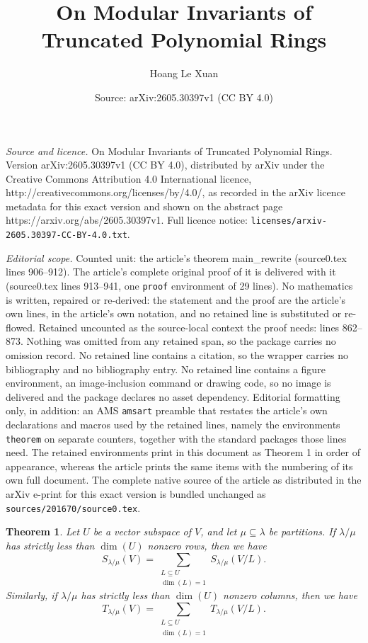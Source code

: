 \documentclass[10pt,a4paper]{amsart}
\title{On Modular Invariants of Truncated Polynomial Rings}
\author{Hoang Le Xuan}
\date{Source: arXiv:2605.30397v1 (CC BY 4.0)}
\newtheorem{theorem}{Theorem}
\begin{document}
\maketitle

\noindent\emph{Source and licence.} On Modular Invariants of Truncated Polynomial Rings. Version arXiv:2605.30397v1 (CC BY 4.0), distributed by arXiv under the Creative Commons Attribution 4.0 International licence, http://creativecommons.org/licenses/by/4.0/, as recorded in the arXiv licence metadata for this exact version and shown on the abstract page https://arxiv.org/abs/2605.30397v1. Full licence notice: \texttt{licenses/arxiv-2605.30397-CC-BY-4.0.txt}.\par\smallskip

\noindent\textit{Editorial scope.} Counted unit: the article's theorem main\_rewrite (source0.tex lines 906--912). The article's complete original proof of it is delivered with it (source0.tex lines 913--941, one \texttt{proof} environment of 29 lines). No mathematics is written, repaired or re-derived: the statement and the proof are the article's own lines, in the article's own notation, and no retained line is substituted or re-flowed.  Retained uncounted as the source-local context the proof needs: lines 862--873.  Nothing was omitted from any retained span, so the package carries no omission record.  No retained line contains a citation, so the wrapper carries no bibliography and no bibliography entry.  No retained line contains a figure environment, an image-inclusion command or drawing code, so no image is delivered and the package declares no asset dependency.  Editorial formatting only, in addition: an AMS \texttt{amsart} preamble that restates the article's own declarations and macros used by the retained lines, namely the environments \texttt{theorem} on separate counters, together with the standard packages those lines need.  The retained environments print in this document as Theorem 1 in order of appearance, whereas the article prints the same items with the numbering of its own full document.  The complete native source of the article as distributed in the arXiv e-print for this exact version is bundled unchanged as \texttt{sources/201670/source0.tex}.
\begin{theorem}\label{gen_of_7.25}
Let $U$ be a vector subspace of $V$, and let $\mu\subseteq \lambda$ be partitions.  If $\lambda/\mu$ has strictly less than $\dim(U)$ nonzero rows, then we have
\begin{equation*}
    S_{\lambda/\mu}(V) = \sum\limits_{\substack{L\subseteq U\\
    \dim(L) = 1}}S_{\lambda/\mu}(V/L).  
\end{equation*}
Similarly, if $\lambda/\mu$ has strictly less than $\dim (U)$ nonzero columns, then we have 
\begin{equation*}
    T_{\lambda/\mu}(V) = \sum\limits_{\substack{L\subseteq U\\
    \dim(L) = 1}}T_{\lambda/\mu}(V/L). 
\end{equation*}
\end{theorem}
\end{document}
